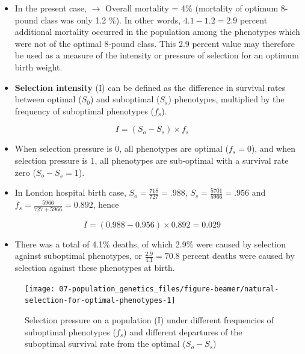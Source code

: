 \documentclass[11pt,dvipsnames,ignorenonframetext,aspectratio=169]{beamer}
\providecommand{\tightlist}{%
  \setlength{\itemsep}{0pt}\setlength{\parskip}{0pt}}
\begin{document}
\begin{frame}{}
\protect\hypertarget{section-5}{}
\footnotesize

\begin{itemize}
\tightlist
\item
  In the present case, \(\longrightarrow\) Overall mortality = 4\%
  (mortality of optimum 8-pound class was only 1.2 \%). In other words,
  \(4.1 - 1.2 = 2.9\) percent additional mortality occurred in the
  population among the phenotypes which were not of the optimal 8-pound
  class. This 2.9 percent value may therefore be used as a measure of
  the intensity or pressure of selection for an optimum birth weight.
\item
  \textbf{Selection intensity} (I) can be defined as the difference in
  survival rates between optimal (\(S_0\)) and suboptimal (\(S_s\))
  phenotypes, multiplied by the frequency of suboptimal phenotypes
  (\(f_s\)).
\end{itemize}

\[
I = (S_o - S_s)\times f_s
\]

\begin{itemize}
\tightlist
\item
  When selection pressure is 0, all phenotypes are optimal
  (\(f_s = 0\)), and when selection pressure is 1, all phenotypes are
  sub-optimal with a survival rate zero (\(S_o - S_s = 1\)).
\item
  In London hospital birth case, \(S_o = \frac{718}{727} = .988\),
  \(S_s = \frac{5701}{5966} = .956\) and
  \(f_s = \frac{5966}{727+5966} = 0.892\), hence
\end{itemize}

\[
I = (0.988 - 0.956)\times 0.892 = 0.029
\]

\begin{itemize}
\tightlist
\item
  There was a total of 4.1\% deaths, of which 2.9\% were caused by
  selection against suboptimal phenotypes, or \(\frac{2.9}{4.1} = 70.8\)
  percent deaths were caused by selection against these phenotypes at
  birth.
\end{itemize}
\end{frame}

\begin{frame}{}
\protect\hypertarget{section-6}{}
\begin{figure}
\texttt{[image: 07-population\_genetics\_files/figure-beamer/natural-selection-for-optimal-phenotypes-1]} \caption{Selection pressure on a population (I) under different frequencies of suboptimal phenotypes ($f_s$) and different departures of the suboptimal survival rate from the optimal ($S_o - S_s$)}\label{fig:natural-selection-for-optimal-phenotypes}
\end{figure}
\end{frame}
\end{document}
